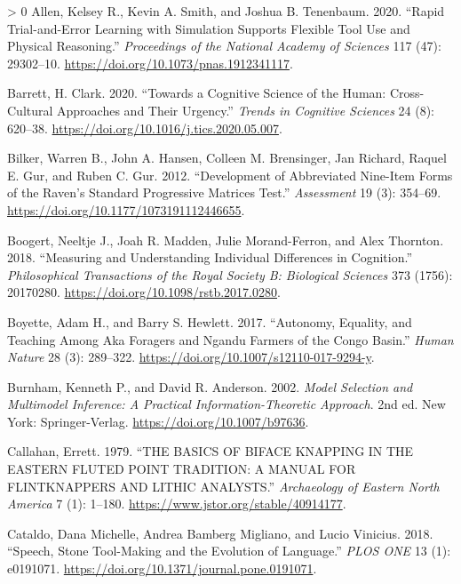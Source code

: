 \documentclass[smallextended]{svjour3}       %
\newlength{\cslhangindent}
\newenvironment{CSLReferences}[3] %
 {%
  \setlength{\parindent}{0pt}
  \ifodd #1 \everypar{\setlength{\hangindent}{\cslhangindent}}\ignorespaces\fi
  \ifnum #2 > 0
  \setlength{\parskip}{#3\baselineskip}
  \fi
 }%
 {}
\begin{document}
\hypertarget{refs}{}
\begin{CSLReferences}{1}{0}
\leavevmode\hypertarget{ref-allen2020}{}%
Allen, Kelsey R., Kevin A. Smith, and Joshua B. Tenenbaum. 2020.
{``Rapid Trial-and-Error Learning with Simulation Supports Flexible Tool
Use and Physical Reasoning.''} \emph{Proceedings of the National Academy
of Sciences} 117 (47): 29302--10.
\url{https://doi.org/10.1073/pnas.1912341117}.

\leavevmode\hypertarget{ref-barrett2020}{}%
Barrett, H. Clark. 2020. {``Towards a Cognitive Science of the Human:
Cross-Cultural Approaches and Their Urgency.''} \emph{Trends in
Cognitive Sciences} 24 (8): 620--38.
\url{https://doi.org/10.1016/j.tics.2020.05.007}.

\leavevmode\hypertarget{ref-bilker2012}{}%
Bilker, Warren B., John A. Hansen, Colleen M. Brensinger, Jan Richard,
Raquel E. Gur, and Ruben C. Gur. 2012. {``Development of Abbreviated
Nine-Item Forms of the Raven{'}s Standard Progressive Matrices Test.''}
\emph{Assessment} 19 (3): 354--69.
\url{https://doi.org/10.1177/1073191112446655}.

\leavevmode\hypertarget{ref-boogert2018}{}%
Boogert, Neeltje J., Joah R. Madden, Julie Morand-Ferron, and Alex
Thornton. 2018. {``Measuring and Understanding Individual Differences in
Cognition.''} \emph{Philosophical Transactions of the Royal Society B:
Biological Sciences} 373 (1756): 20170280.
\url{https://doi.org/10.1098/rstb.2017.0280}.

\leavevmode\hypertarget{ref-boyette2017}{}%
Boyette, Adam H., and Barry S. Hewlett. 2017. {``Autonomy, Equality, and
Teaching Among Aka Foragers and Ngandu Farmers of the Congo Basin.''}
\emph{Human Nature} 28 (3): 289--322.
\url{https://doi.org/10.1007/s12110-017-9294-y}.

\leavevmode\hypertarget{ref-burnham2002}{}%
Burnham, Kenneth P., and David R. Anderson. 2002. \emph{Model Selection
and Multimodel Inference: A Practical Information-Theoretic Approach}.
2nd ed. New York: Springer-Verlag. \url{https://doi.org/10.1007/b97636}.

\leavevmode\hypertarget{ref-callahan1979}{}%
Callahan, Errett. 1979. {``THE BASICS OF BIFACE KNAPPING IN THE EASTERN
FLUTED POINT TRADITION: A MANUAL FOR FLINTKNAPPERS AND LITHIC
ANALYSTS.''} \emph{Archaeology of Eastern North America} 7 (1): 1--180.
\url{https://www.jstor.org/stable/40914177}.

\leavevmode\hypertarget{ref-cataldo2018}{}%
Cataldo, Dana Michelle, Andrea Bamberg Migliano, and Lucio Vinicius.
2018. {``Speech, Stone Tool-Making and the Evolution of Language.''}
\emph{PLOS ONE} 13 (1): e0191071.
\url{https://doi.org/10.1371/journal.pone.0191071}.


\end{CSLReferences}
\end{document}
